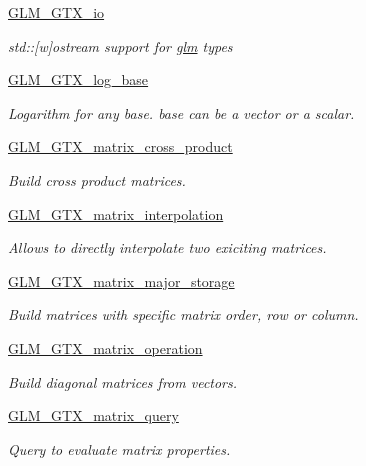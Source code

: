 \begin{CompactItemize}
\item 
\hyperlink{group__gtx__io}{GLM\_\-GTX\_\-io}
\begin{CompactList}\small\item\em std::\mbox{[}w\mbox{]}ostream support for \hyperlink{namespaceglm}{glm} types \item\end{CompactList}

\item 
\hyperlink{group__gtx__log__base}{GLM\_\-GTX\_\-log\_\-base}
\begin{CompactList}\small\item\em Logarithm for any base. base can be a vector or a scalar. \item\end{CompactList}

\item 
\hyperlink{group__gtx__matrix__cross__product}{GLM\_\-GTX\_\-matrix\_\-cross\_\-product}
\begin{CompactList}\small\item\em Build cross product matrices. \item\end{CompactList}

\item 
\hyperlink{group__gtx__matrix__interpolation}{GLM\_\-GTX\_\-matrix\_\-interpolation}
\begin{CompactList}\small\item\em Allows to directly interpolate two exiciting matrices. \item\end{CompactList}

\item 
\hyperlink{group__gtx__matrix__major__storage}{GLM\_\-GTX\_\-matrix\_\-major\_\-storage}
\begin{CompactList}\small\item\em Build matrices with specific matrix order, row or column. \item\end{CompactList}

\item 
\hyperlink{group__gtx__matrix__operation}{GLM\_\-GTX\_\-matrix\_\-operation}
\begin{CompactList}\small\item\em Build diagonal matrices from vectors. \item\end{CompactList}

\item 
\hyperlink{group__gtx__matrix__query}{GLM\_\-GTX\_\-matrix\_\-query}
\begin{CompactList}\small\item\em Query to evaluate matrix properties. \item\end{CompactList}


\end{CompactItemize}
